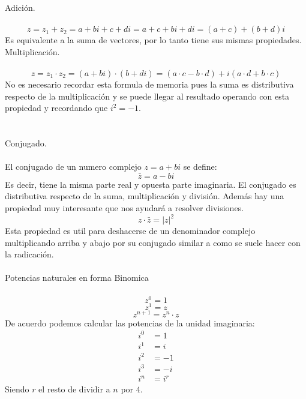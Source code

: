 \documentclass[]{article}
\begin{document}
\Large Adición.
\normalsize
\\
\\
$$
z = z_1 +z_2 = a+bi + c+di = a+c+bi+di = (a+c) + (b+d) i
$$
Es equivalente a la suma de vectores, por lo tanto tiene sus mismas propiedades.
\Large Multiplicación.
\normalsize
\\
\\
$$
z = z_1 \cdot z_2 = (a+bi)\cdot(b+di) = (a\cdot c - b\cdot d) + i(a\cdot d + b \cdot c) 
$$
No es necesario recordar esta formula de memoria pues la suma es distributiva respecto de la multiplicación y se puede llegar al resultado operando con esta propiedad y recordando que $i^{2} = -1$.
\\
\\\\
\Large Conjugado.
\normalsize
\\
\\
El conjugado de un numero complejo $z=a+bi$ se define:
$$
\bar{z} = a - bi
$$
Es decir, tiene la misma parte real y opuesta parte imaginaria. El conjugado es distributiva respecto de la suma, multiplicación y división. Además hay una propiedad muy interesante que nos ayudará a resolver divisiones.
$$
z \cdot \bar{z} = |z|^{2}
$$
Esta propiedad es util para deshacerse de un denominador complejo multiplicando arriba y abajo por su conjugado similar a como se suele hacer con la radicación.
\\
\\
\Large Potencias naturales en forma Binomica
\normalsize
\\
\\
$$
z^{0} = 1
$$
$$
z^{1} = z
$$
$$
z^{n+1} = z^{n}\cdot z
$$
De acuerdo podemos calcular las potencias de la unidad imaginaria:
\begin{align}
  i^{0} &= 1 \\
  i^{1} &= i \\
  i^{2} &= -1 \\
  i^{3} &= -i \\
  i^{n} &= i^{r}
\end{align}
Siendo $r$ el resto de dividir a $n$ por $4$.
\\
\end{document}
